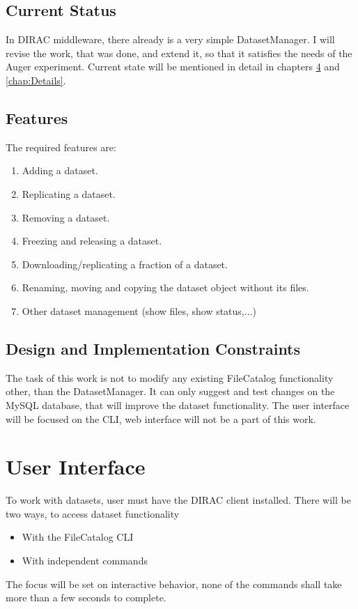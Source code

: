 \documentclass{scrreprt}
\begin{document}
\section{Current Status}

In DIRAC middleware, there already is a very simple DatasetManager. I will revise the work, that was done, and extend it, so that it satisfies the needs of the Auger experiment. Current state will be mentioned in detail in chapters \ref{chap:UI} and \ref{chap:Details}. 


\section{Features}

The required features are:

\begin{enumerate}
\item Adding a dataset.
\item Replicating a dataset.
\item Removing a dataset.
\item Freezing and releasing a dataset.
\item Downloading/replicating a fraction of a dataset.
\item Renaming, moving and copying the dataset object without its files.
\item Other dataset management (show files, show status,...)
\end{enumerate}


\section{Design and Implementation Constraints}
The task of this work is not to modify any existing FileCatalog functionality other, than the DatasetManager. It can only suggest and test changes on the MySQL database, that will improve the dataset functionality. The user interface will be focused on the CLI, web interface will not be a part of this work.


\chapter{User Interface} \label{chap:UI}
To work with datasets, user must have the DIRAC client installed. There will be two ways, to access dataset functionality
\begin{itemize}
\item With the FileCatalog CLI
\item With independent commands
\end{itemize}
The focus will be set on interactive behavior, none of the commands shall take more than a few seconds to complete. 
\end{document}
